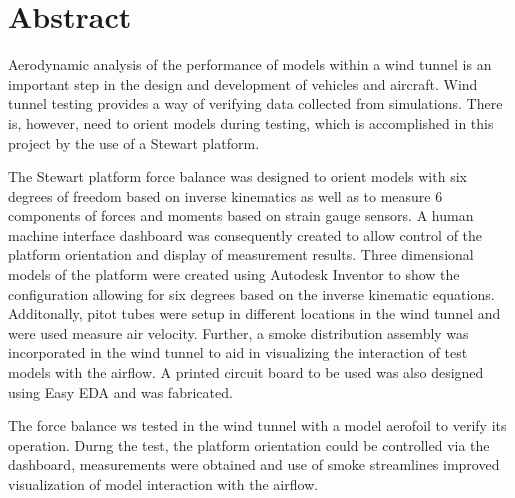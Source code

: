 
\section*{Abstract}
\label{sec:Abstract}
Aerodynamic analysis of the performance of models within a wind tunnel is an important step in the design and development of vehicles and aircraft. Wind tunnel testing provides a way of verifying data collected from simulations.
There is, however, need to orient models during testing, which is accomplished in this project by the use of a Stewart platform.

The Stewart platform force balance was designed to orient models with six degrees of freedom based on inverse kinematics
as well as to measure 6 components of forces and moments based on strain gauge sensors. 
A human machine interface dashboard was consequently created to allow control of the platform orientation and display of measurement results. Three dimensional models of the platform were created using Autodesk Inventor to show the configuration allowing for six degrees based on the inverse kinematic equations. 
Additonally, pitot tubes were setup in different locations in the wind tunnel and were used measure air velocity. Further,
a smoke distribution assembly was incorporated in the wind tunnel to aid in visualizing the interaction
of test models with the airflow. A printed circuit board to be used was also designed using Easy EDA and was fabricated. 


The force balance ws tested in the wind tunnel with a model aerofoil to verify its operation. Durng the test,
the platform orientation could be controlled via the dashboard, measurements were obtained and use of smoke 
streamlines improved visualization of model interaction with the airflow.